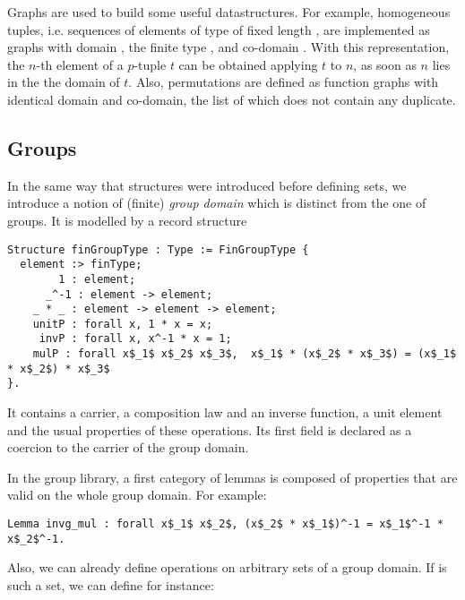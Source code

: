 Graphs are used to build some useful datastructures. For example,
homogeneous tuples, i.e. sequences of elements of type  of fixed length , 
are implemented as graphs with domain , the finite type ,
and co-domain . With this representation, the
$n$-th element of a $p$-tuple $t$ can be obtained applying $t$ to $n$,
as soon as $n$ lies in the the domain of $t$. Also, permutations
are defined as function graphs with identical domain and co-domain,
the  list of which does not contain any duplicate.

\subsection{Groups}

In the same way that  structures were introduced before defining
sets, we introduce a notion of (finite) \emph{group domain} which is
distinct from the one of groups. It is modelled by a 
record structure
\begin{lstlisting}
Structure finGroupType : Type := FinGroupType {
  element :> finType;
        1 : element;
      _^-1 : element -> element;
    _ * _ : element -> element -> element;
    unitP : forall x, 1 * x = x;
     invP : forall x, x^-1 * x = 1;
    mulP : forall x$_1$ x$_2$ x$_3$,  x$_1$ * (x$_2$ * x$_3$) = (x$_1$ * x$_2$) * x$_3$
}.
\end{lstlisting}
It contains a carrier, a composition law
and an inverse function, a unit element and the usual properties of these
operations. Its first field is declared as a coercion to the carrier
of the group domain.

In the group library, a first category of lemmas is composed of 
properties that are valid on the whole group domain. For example:

\begin{lstlisting}
Lemma invg_mul : forall x$_1$ x$_2$, (x$_2$ * x$_1$)^-1 = x$_1$^-1 * x$_2$^-1. 
\end{lstlisting}

Also, we can already define operations on arbitrary sets of a group
domain. If  is such a set, we can define for instance:

